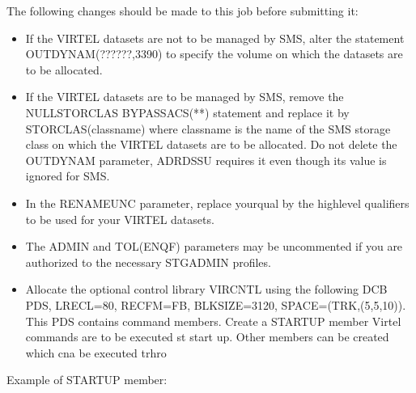 \documentclass[letterpaper,10pt,english]{sphinxmanual}
\begin{document}
\sphinxAtStartPar
The following changes should be made to this job before submitting it:
\begin{itemize}
\item {} 
\sphinxAtStartPar
If the VIRTEL datasets are not to be managed by SMS, alter the statement OUTDYNAM(??????,3390) to specify the volume on which the datasets are to be allocated.

\item {} 
\sphinxAtStartPar
If the VIRTEL datasets are to be managed by SMS, remove the NULLSTORCLAS BYPASSACS(**) statement and replace it by STORCLAS(classname) where classname is the name of the SMS storage class on which the VIRTEL datasets are to be allocated. Do not delete the OUTDYNAM parameter, ADRDSSU requires it even though its value is ignored for SMS.

\item {} 
\sphinxAtStartPar
In the RENAMEUNC parameter, replace yourqual by the high\sphinxhyphen{}level qualifiers to be used for your VIRTEL datasets.

\item {} 
\sphinxAtStartPar
The ADMIN and TOL(ENQF) parameters may be uncommented if you are authorized to the necessary STGADMIN profiles.

\item {} 
\sphinxAtStartPar
Allocate the optional control library VIRCNTL using the following DCB PDS, LRECL=80, RECFM=FB, BLKSIZE=3120, SPACE=(TRK,(5,5,10)). This PDS contains command members. Create a STARTUP member Virtel commands are to be executed st start up. Other members can be created which cna be executed trhro

\end{itemize}

\sphinxAtStartPar
Example of STARTUP member: \sphinxhyphen{}

\begin{sphinxVerbatim}[commandchars=\\\{\}]
    
   
   
    
       
   
   
   
\end{sphinxVerbatim}
\end{document}
